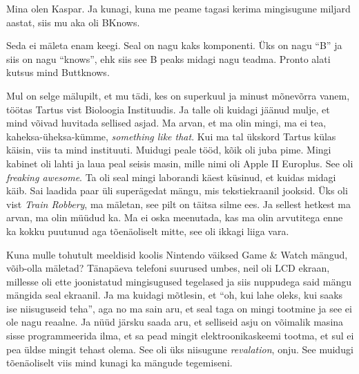 

Mina olen Kaspar. Ja kunagi, kuna me peame tagasi kerima mingisugune miljard 
aastat, siis mu aka oli BKnows. 


Seda ei mäleta enam keegi. Seal on nagu kaks komponenti. Üks on nagu 
\enquote{B} ja siis on nagu \enquote{knows}, ehk siis see B peaks  midagi nagu 
teadma. Pronto alati kutsus mind Buttknows.


Mul on selge mälupilt, et mu tädi, kes on superkuul ja minust mõnevõrra vanem, 
töötas Tartus
vist Bioloogia Instituudis. Ja  talle oli kuidagi jäänud mulje, et mind võivad 
huvitada sellised asjad. Ma arvan, et ma olin mingi, ma ei tea, 
kaheksa-üheksa-kümme, \emph{something like that}. Kui ma tal ükskord Tartus 
külas käisin, viis ta mind instituuti. Muidugi peale tööd, kõik oli juba pime. 
Mingi kabinet oli lahti ja laua peal seisis masin, mille nimi oli Apple II 
Europlus. See oli \emph{freaking awesome}. Ta oli 
seal mingi laborandi käest küsinud, et kuidas  midagi käib. Sai laadida paar 
üli superägedat mängu, mis tekstiekraanil jooksid. Üks oli vist \emph{Train 
Robbery}, ma mäletan, see pilt on täitsa silme ees. 
Ja sellest hetkest ma arvan, ma olin müüdud ka. Ma ei oska  meenutada, kas ma 
olin arvutitega enne ka kokku puutunud aga tõenäoliselt mitte, see oli ikkagi 
liiga  vara. 

Kuna mulle tohutult meeldisid koolis Nintendo väiksed Game \& 
Watch mängud, võib-olla mäletad? Tänapäeva 
telefoni suurused umbes, neil oli LCD ekraan, millesse oli ette joonistatud 
mingisugused tegelased ja siis nuppudega said mängu mängida seal 
ekraanil. Ja  ma kuidagi mõtlesin, et \enquote{oh, kui 
lahe oleks, kui saaks ise niisuguseid teha}, aga no ma sain aru, et seal taga 
on mingi tootmine ja see ei ole nagu reaalne. Ja nüüd järsku saada aru, et 
selliseid asju on võimalik  masina sisse programmeerida ilma, et sa pead mingit 
elektroonikaskeemi tootma, et sul ei pea üldse mingit tehast olema. See oli üks 
niisugune \emph{revalation}, onju. See muidugi  tõenäoliselt viis mind kunagi 
ka mängude tegemiseni. 

